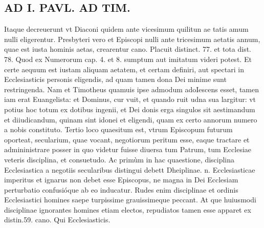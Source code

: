 \documentclass{article}
\begin{document}
\begin{pages}
\section*{AD I. PAVL. AD TIM. }
\marginpar{[ p.148 ]}\pstart Itaque decreuerunt vt Diaconi quidem ante vicesimum quilitun ae tatis amum nulli eligerentur.  \pend\pstart Presbyteri vero et Episcopi nulli ante tricesimum aetatis annum, quae est iusta hominis aetas, crearentur cano. Placuit distinct. 77. et tota dist. 78. Quod ex Numerorum cap. 4. et 8. sumptum aut imitatum videri potest. Et certe aequum est iustam aliquam aetatem, et certam definiri, aut spectari in Ecclesiasticis personis eligendis, ad quam tamen dona Dei minime sunt restringenda. Nam et Timotheus quamuis ipse admodum adoIescens esset, tamen iam erat Euangelista: et Dominus, cur vuit, et quando ruit udna sua largitur: vt potius hoc totum ex dotibus ingenii, et Dei donis erga singulos sit aestimandum et diiudicandum, quinam sint idonei et eligendi, quam ex certo annorum numero a nobis constituto.  \pend\pstart Tertio loco quaesitum est, vtrum Episcopum futurum oporteat, secularium, quae vocant, negotiorum peritum esse, eaque tractare et admininistrare posser in quo videtur fuisse diuersa tum Patrum, tum Ecclesiae veteris disciplina, et consuetudo. Ac primùm in hac quaestione, disciplina Ecclesiastica a negotiis secularibus distingui debett Dheiplinae. n. Ecclesiasticae imperitus et ignarus non debet esse Episcopus, ne magna in Dei Ecclesiam perturbatio confusióque ab eo inducatur. Rudes enim disciplinae et ordinis Ecclesiastici homines saepe turpissime grauissimeque peccant. At que huiusmodi disciplinae ignorantes homines etiam electos, repudiatos tamen esse apparet ex distin.59. cano. Qui Ecclesiasticis.  \pend

\end{pages}
\end{document}
